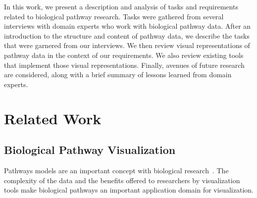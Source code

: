 
In this work, we present a description and analysis of tasks and requirements related to biological pathway research.
Tasks were gathered from several interviews with domain experts who work with biological pathway data.
After an introduction to the structure and content of pathway data, we describe the tasks that were garnered from our interviews.
We then review visual representations of pathway data in the context of our requirements.
We also review existing tools that implement those visual representations.
Finally, avenues of future research are considered, along with a brief summary of lessons learned from domain experts.

\section{Related Work}
\subsection{Biological Pathway Visualization}


Pathways models are an important concept with biological research~\cite{cairns2011regulation, luo2003targeting,reya2001stem}.
The complexity of the data and the benefits offered to researchers by visualization tools make biological pathways an important application domain for visualization.



